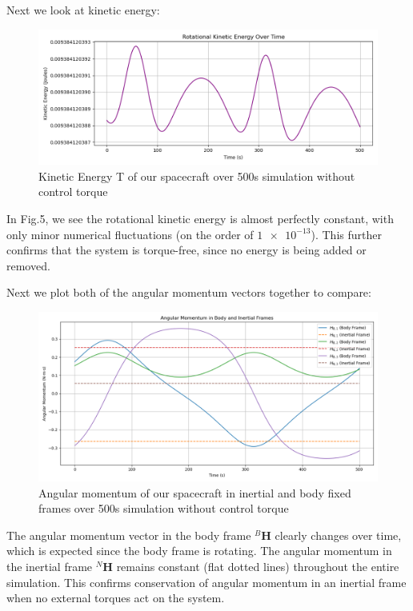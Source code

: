 \documentclass[conf]{new-aiaa}
\begin{document}
Next we look at kinetic energy:
\begin{figure}[H]
    \centering
    \captionsetup{width=.7\linewidth}
    \includegraphics[width=1\linewidth]{task7_kinetic_energy.png}
    \caption{Kinetic Energy T of our spacecraft over 500s simulation without control torque}
    \label{fig:enter-label}
\end{figure}
In Fig.5, we see the rotational kinetic energy is almost perfectly constant, with only minor numerical fluctuations (on the order of $\num{1e-13}$). This further confirms that the system is torque-free, since no energy is being added or removed.

Next we plot both of the angular momentum vectors together to compare:
\begin{figure}[H]
    \centering
    \captionsetup{width=.7\linewidth}
    \includegraphics[width=1\linewidth]{task7_angular_momentum.png}
    \caption{Angular momentum of our spacecraft in inertial and body fixed frames over 500s simulation without control torque}
    \label{fig:enter-label}
\end{figure}
The angular momentum vector in the body frame ${}^B\mathbf{H}$ clearly changes over time, which is expected since the body frame is rotating. The angular momentum in the inertial frame ${}^N\mathbf{H}$ remains constant (flat dotted lines) throughout the entire simulation. This confirms conservation of angular momentum in an inertial frame when no external torques act on the system.
\end{document}

